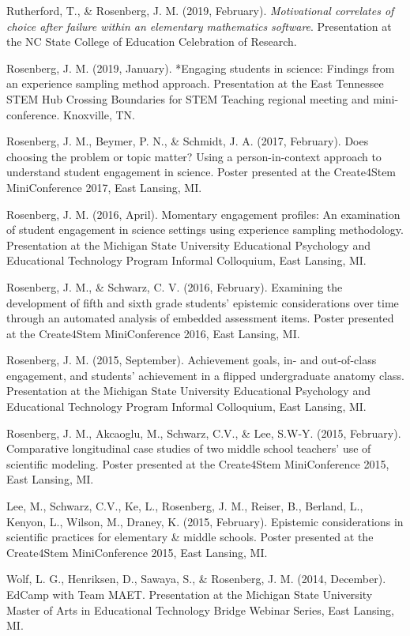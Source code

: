 \documentclass[14,]{article}
\begin{document}
Rutherford, T., \& Rosenberg, J. M. (2019, February). \emph{Motivational
correlates of choice after failure within an elementary mathematics
software}. Presentation at the NC State College of Education Celebration
of Research.

Rosenberg, J. M. (2019, January). *Engaging students in science:
Findings from an experience sampling method approach. Presentation at
the East Tennessee STEM Hub Crossing Boundaries for STEM Teaching
regional meeting and mini-conference. Knoxville, TN.

Rosenberg, J. M., Beymer, P. N., \& Schmidt, J. A. (2017, February).
Does choosing the problem or topic matter? Using a person-in-context
approach to understand student engagement in science. Poster presented
at the Create4Stem MiniConference 2017, East Lansing, MI.

Rosenberg, J. M. (2016, April). Momentary engagement profiles: An
examination of student engagement in science settings using experience
sampling methodology. Presentation at the Michigan State University
Educational Psychology and Educational Technology Program Informal
Colloquium, East Lansing, MI.

Rosenberg, J. M., \& Schwarz, C. V. (2016, February). Examining the
development of fifth and sixth grade students' epistemic considerations
over time through an automated analysis of embedded assessment items.
Poster presented at the Create4Stem MiniConference 2016, East Lansing,
MI.

Rosenberg, J. M. (2015, September). Achievement goals, in- and
out-of-class engagement, and students' achievement in a flipped
undergraduate anatomy class. Presentation at the Michigan State
University Educational Psychology and Educational Technology Program
Informal Colloquium, East Lansing, MI.

Rosenberg, J. M., Akcaoglu, M., Schwarz, C.V., \& Lee, S.W-Y. (2015,
February). Comparative longitudinal case studies of two middle school
teachers' use of scientific modeling. Poster presented at the
Create4Stem MiniConference 2015, East Lansing, MI.

Lee, M., Schwarz, C.V., Ke, L., Rosenberg, J. M., Reiser, B., Berland,
L., Kenyon, L., Wilson, M., Draney, K. (2015, February). Epistemic
considerations in scientific practices for elementary \& middle schools.
Poster presented at the Create4Stem MiniConference 2015, East Lansing,
MI.

Wolf, L. G., Henriksen, D., Sawaya, S., \& Rosenberg, J. M. (2014,
December). EdCamp with Team MAET. Presentation at the Michigan State
University Master of Arts in Educational Technology Bridge Webinar
Series, East Lansing, MI.
\end{document}
